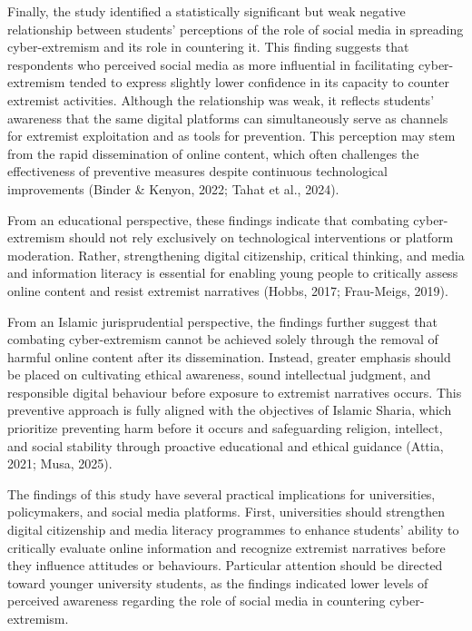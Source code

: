 \documentclass[10pt]{NSP1}
\begin{document}
Finally, the study identified a statistically significant but weak negative relationship between students' perceptions of the role of social media in spreading cyber-extremism and its role in countering it. This finding suggests that respondents who perceived social media as more influential in facilitating cyber-extremism tended to express slightly lower confidence in its capacity to counter extremist activities. Although the relationship was weak, it reflects students' awareness that the same digital platforms can simultaneously serve as channels for extremist exploitation and as tools for prevention. This perception may stem from the rapid dissemination of online content, which often challenges the effectiveness of preventive measures despite continuous technological improvements (Binder \& Kenyon, 2022; Tahat et al., 2024).

From an educational perspective, these findings indicate that combating cyber-extremism should not rely exclusively on technological interventions or platform moderation. Rather, strengthening digital citizenship, critical thinking, and media and information literacy is essential for enabling young people to critically assess online content and resist extremist narratives (Hobbs, 2017; Frau-Meigs, 2019).

From an Islamic jurisprudential perspective, the findings further suggest that combating cyber-extremism cannot be achieved solely through the removal of harmful online content after its dissemination. Instead, greater emphasis should be placed on cultivating ethical awareness, sound intellectual judgment, and responsible digital behaviour before exposure to extremist narratives occurs. This preventive approach is fully aligned with the objectives of Islamic Sharia, which prioritize preventing harm before it occurs and safeguarding religion, intellect, and social stability through proactive educational and ethical guidance (Attia, 2021; Musa, 2025).

\par\medskip{}\smallskip

The findings of this study have several practical implications for universities, policymakers, and social media platforms. First, universities should strengthen digital citizenship and media literacy programmes to enhance students' ability to critically evaluate online information and recognize extremist narratives before they influence attitudes or behaviours. Particular attention should be directed toward younger university students, as the findings indicated lower levels of perceived awareness regarding the role of social media in countering cyber-extremism.
\end{document}

